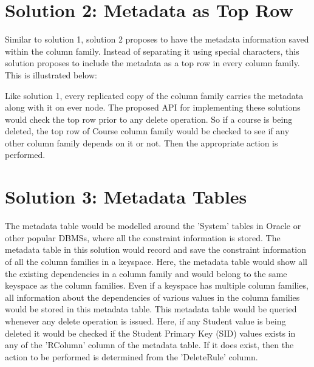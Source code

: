 \section{Solution 2:  Metadata as Top Row}\label{s:sol2}
Similar to solution 1, solution 2 proposes to have the metadata information
saved within the column family. Instead of separating it using special
characters, this solution proposes to include the metadata as a top row in every
column family. This is illustrated below:

Like solution 1, every replicated copy of the column family carries the metadata
along with it on ever node.
The proposed API for implementing these solutions would check the top row prior
to any delete operation. So if a course is being deleted, the top row of Course
column family would be checked to see if any other column family depends on it
or not. Then the appropriate action is performed.


\section{Solution 3:  Metadata Tables}\label{s:sol3}
The metadata table would be modelled around the 'System' tables in Oracle or
other popular DBMSs, where all the constraint information is stored. The
metadata table in this solution would record and save the constraint information
of all the column families in a keyspace. Here, the metadata table would show
all the existing dependencies in a column family and would belong to the same
keyspace as the column families.
Even if a keyspace has multiple column families, all information about the
dependencies of various values in the column families would be stored in this
metadata table.
This metadata table would be queried whenever any delete operation is issued.
Here, if any Student value is being deleted it would be checked if the Student
Primary Key (SID) values exists in any of the 'RColumn' column of the metadata
table. If it does exist, then the action to be performed is determined from the
'DeleteRule' column.

